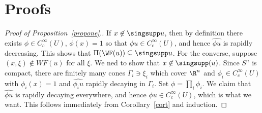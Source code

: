 \documentclass[12pt]{article}
\begin{document}
\section{Proofs}
\begin{proof}[Proof of Proposition~\ref{propone}.] If $x \not \in \singsupp u$, then by definition there exists $\phi \in C_c^\infty(U)$, $\phi(x) = 1$ so that $\phi u \in C_c^\infty(U)$, and hence $\widehat{\phi u}$ is rapidly decreasing. This shows that $\Pi(\WF(u)) \subseteq \singsupp u$. For the converse, suppose $(x,\xi) \not \in WF(u)$ for all $\xi$. We ned to show that $x \not \in \singsupp(u)$. Since $S^n$ is compact, there are finitely many cones $\Gamma_i \ni \xi_i$ which cover $\R^n$ and $\phi_i \in C_c^\infty(U)$ with $\phi_i(x) = 1$ and $\widehat{\phi_i u}$ rapidly decaying in $\Gamma_i$. Set $\phi = \prod_i \phi_i$. We claim that $\widehat{\phi u}$ is rapidly decaying everywhere, and hence $\phi u \in C_c^\infty(U)$, which is what we want. This follows immediately from Corollary~\ref{cort} and induction.\end{proof}
\end{document}
